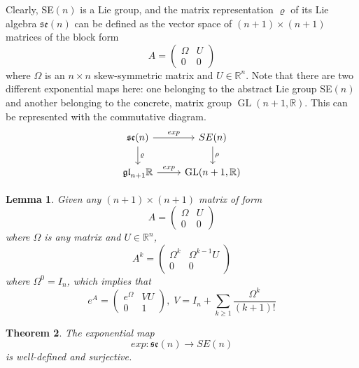\documentclass{article}
\DeclareMathOperator{\GL}{GL}
\newtheorem{theorem}{Theorem}[section]
\newtheorem{lemma}[theorem]{Lemma}
\theoremstyle{remark}
\theoremstyle{definition}
\begin{document}
Clearly, SE$(n)$ is a Lie group, and the matrix representation $\varrho$ of its Lie algebra $\mathfrak{se}(n)$ can be defined as the vector space of $(n+1) \times (n+1)$ matrices of the block form 
\[A = \begin{pmatrix}
\Omega & U \\0 & 0
\end{pmatrix}\]
where $\Omega$ is an $n \times n$ skew-symmetric matrix and $U \in \mathbb{R}^n$. Note that there are two different exponential maps here: one belonging to the abstract Lie group SE$(n)$ and another belonging to the concrete, matrix group $\GL(n+1, \mathbb{R})$. This can be represented with the commutative diagram. 
\[\begin{tikzcd}
\mathfrak{se}(n) \arrow{r}{exp} \arrow{d}{\varrho} & SE(n) \arrow{d} {\rho}\\
\mathfrak{gl}_{n+1} \mathbb{R} \arrow{r}{exp} & \GL(n+1, \mathbb{R})
\end{tikzcd}\]
\begin{lemma}
Given any $(n+1) \times (n+1)$ matrix of form 
\[A = \begin{pmatrix}
 \Omega & U \\0&0
\end{pmatrix}\]
where $\Omega$ is any matrix and $U \in \mathbb{R}^n$, 
\[A^k = \begin{pmatrix}
\Omega^k & \Omega^{k-1} U \\0&0
\end{pmatrix}\]
where $\Omega^0 = I_n$, which implies that
\[e^A = \begin{pmatrix}
e^\Omega & V U \\ 0 & 1
\end{pmatrix}, \; V = I_n + \sum_{k \geq 1} \frac{\Omega^k}{(k+1)!}\]
\end{lemma}

\begin{theorem}
The exponential map
\[exp: \mathfrak{se}(n) \longrightarrow SE(n)\]
is well-defined and surjective. 
\end{theorem}
\end{document}
